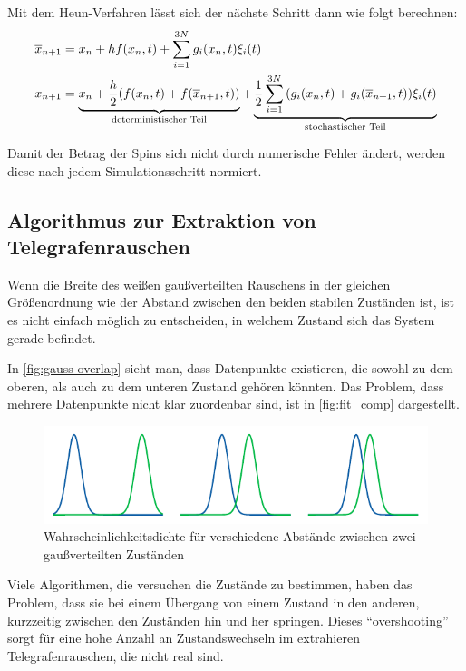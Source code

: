 \documentclass[main.tex]{subfiles}
\begin{document}
Mit dem Heun-Verfahren lässt sich der nächste Schritt dann wie folgt berechnen:
\begin{align}
    \overline{x}_{n+1} &= x_n + h f(x_n,t) + \sum_{i=1}^{3N} g_i(x_n,t) \xi_i(t) \\
    x_{n+1} &= \underbrace{x_n + \frac{h}{2} \qty(f(x_n,t) + f(\overline{x}_{n+1},t))}_\text{deterministischer Teil} + \underbrace{\frac{1}{2} \sum_{i=1}^{3N} \qty(g_i(x_n,t) + g_i(\overline{x}_{n+1},t)) \xi_i(t)}_\text{stochastischer Teil}
\end{align}

Damit der Betrag der Spins sich nicht durch numerische Fehler ändert, werden diese nach jedem Simulationsschritt normiert.

\subsection{Algorithmus zur Extraktion von Telegrafenrauschen}\label{algo}

Wenn die Breite des weißen gaußverteilten Rauschens in der gleichen Größenordnung wie der Abstand zwischen den beiden stabilen Zuständen ist, ist es nicht einfach möglich zu entscheiden, in welchem Zustand sich das System gerade befindet.

In \cref{fig:gauss-overlap} sieht man, dass Datenpunkte existieren, die sowohl zu dem oberen, als auch zu dem unteren Zustand gehören könnten. Das Problem, dass mehrere Datenpunkte nicht klar zuordenbar sind, ist in \ref{fig:fit_comp} dargestellt.

\begin{figure}[h]
    \centering
    \includegraphics{bilder/plots/theo-vis/gauss-overlap.pdf}
    \caption{Wahrscheinlichkeitsdichte für verschiedene Abstände zwischen zwei gaußverteilten Zuständen \label{fig:gauß-overlap}}
\end{figure}

Viele Algorithmen, die versuchen die Zustände zu bestimmen, haben das Problem, dass sie bei einem Übergang von einem Zustand in den anderen, kurzzeitig zwischen den Zuständen hin und her springen. Dieses \enquote{overshooting} sorgt für eine hohe Anzahl an Zustandswechseln im extrahieren Telegrafenrauschen, die nicht real sind.
\end{document}
